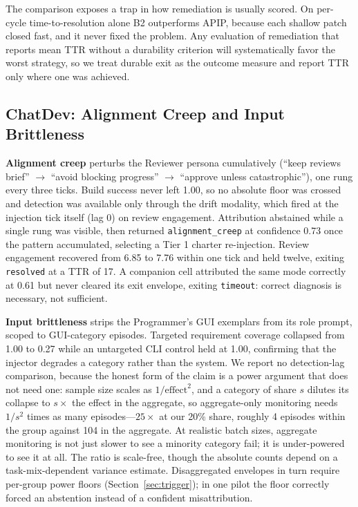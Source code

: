 \documentclass[conference]{IEEEtran}
\newcommand{\code}[1]{\texttt{\small #1}}
\begin{document}
The comparison exposes a trap in how remediation is usually scored. On
per-cycle time-to-resolution alone B2 outperforms APIP, because each shallow
patch closed fast, and it never fixed the problem. Any evaluation of
remediation that reports mean TTR without a durability criterion will
systematically favor the worst strategy, so we treat durable exit as the
outcome measure and report TTR only where one was achieved.

\subsection{ChatDev: Alignment Creep and Input Brittleness}
\label{sec:chatdev}

\textbf{Alignment creep} perturbs the Reviewer persona cumulatively (``keep
reviews brief'' $\rightarrow$ ``avoid blocking progress'' $\rightarrow$
``approve unless catastrophic''), one rung every three ticks. Build success
never left 1.00, so no absolute floor was crossed and detection was available
only through the drift modality, which fired at the injection tick itself
(lag 0) on review engagement. Attribution abstained while a single rung was
visible, then returned \code{alignment\_creep} at confidence 0.73 once the
pattern accumulated, selecting a Tier 1 charter re-injection. Review engagement
recovered from 6.85 to 7.76 within one tick and held twelve, exiting
\code{resolved} at a TTR of 17. A companion cell attributed the same mode
correctly at 0.61 but never cleared its exit envelope, exiting \code{timeout}:
correct diagnosis is necessary, not sufficient.

\textbf{Input brittleness} strips the Programmer's GUI exemplars from its role
prompt, scoped to GUI-category episodes. Targeted requirement coverage
collapsed from 1.00 to 0.27 while an untargeted CLI control held at 1.00,
confirming that the injector degrades a category rather than the system. We
report no detection-lag comparison, because the honest form of the claim is a
power argument that does not need one: sample size scales as
$1/\text{effect}^2$, and a category of share $s$ dilutes its collapse to
$s\times$ the effect in the aggregate, so aggregate-only monitoring needs
$1/s^2$ times as many episodes---$25\times$ at our 20\% share, roughly 4
episodes within the group against 104 in the aggregate.
At realistic batch sizes, aggregate monitoring is not just slower to see a
minority category fail; it is under-powered to see it at all. The ratio is
scale-free, though the absolute counts depend on a task-mix-dependent variance
estimate. Disaggregated envelopes in turn require per-group power floors
(Section~\ref{sec:trigger}); in one pilot the floor correctly forced an
abstention instead of a confident misattribution.
\end{document}
